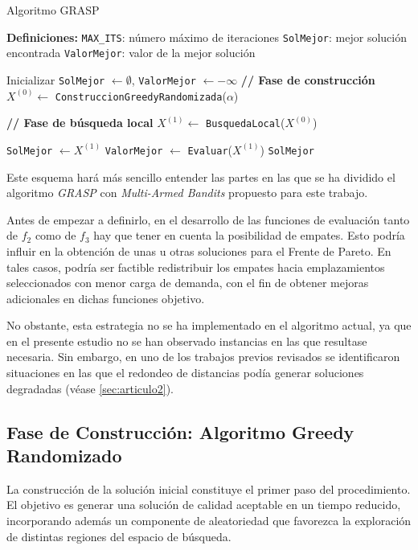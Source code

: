 \documentclass[12pt,a4paper]{book}
\begin{document}
\begin{algorithm}[H]
\caption{Algoritmo GRASP}
\begin{algorithmic}[1]
\Statex \textbf{Definiciones:}
\Statex \hspace{1em} \texttt{MAX\_ITS}: número máximo de iteraciones
\Statex \hspace{1em} \texttt{SolMejor}: mejor solución encontrada
\Statex \hspace{1em} \texttt{ValorMejor}: valor de la mejor solución

\Statex

\State Inicializar \texttt{SolMejor} $\gets \emptyset$, \texttt{ValorMejor} $\gets -\infty$
    \Statex \textbf{// Fase de construcción}
    \State $X^{(0)}\gets$ \texttt{ConstruccionGreedyRandomizada}($\alpha$)
    
    \Statex \textbf{// Fase de búsqueda local}
    \State $X^{(1)}\gets$ \texttt{BusquedaLocal}($X^{(0)}$)

        \State \texttt{SolMejor} $\gets X^{(1)}$
        \State \texttt{ValorMejor} $\gets$ \texttt{Evaluar}($X^{(1)}$)
    \EndIf
\EndFor
\State \Return \texttt{SolMejor}


\end{algorithmic}
\end{algorithm}

Este esquema hará más sencillo entender las partes en las que se ha dividido el algoritmo \textit{GRASP} con \textit{Multi-Armed Bandits} propuesto para este trabajo.

Antes de empezar a definirlo, en el desarrollo de las funciones de evaluación tanto de $f_2$ como de $f_3$ hay que tener en cuenta la posibilidad de empates. Esto podría influir en la obtención de unas u otras soluciones para el Frente de Pareto. 
En tales casos, podría ser factible redistribuir los empates hacia emplazamientos seleccionados con menor carga de demanda, con el fin de obtener mejoras adicionales en dichas funciones objetivo.  

No obstante, esta estrategia no se ha implementado en el algoritmo actual, ya que en el presente estudio no se han observado instancias en las que resultase necesaria. Sin embargo, en uno de los trabajos previos revisados se identificaron situaciones en las que el redondeo de distancias podía generar soluciones degradadas (véase \ref{sec:articulo2}).  

\subsection{Fase de Construcción: Algoritmo Greedy Randomizado}
La construcción de la solución inicial constituye el primer paso del procedimiento. El objetivo es generar una solución de calidad aceptable en un tiempo reducido, incorporando además un componente de aleatoriedad que favorezca la exploración de distintas regiones del espacio de búsqueda.  
\end{document}
